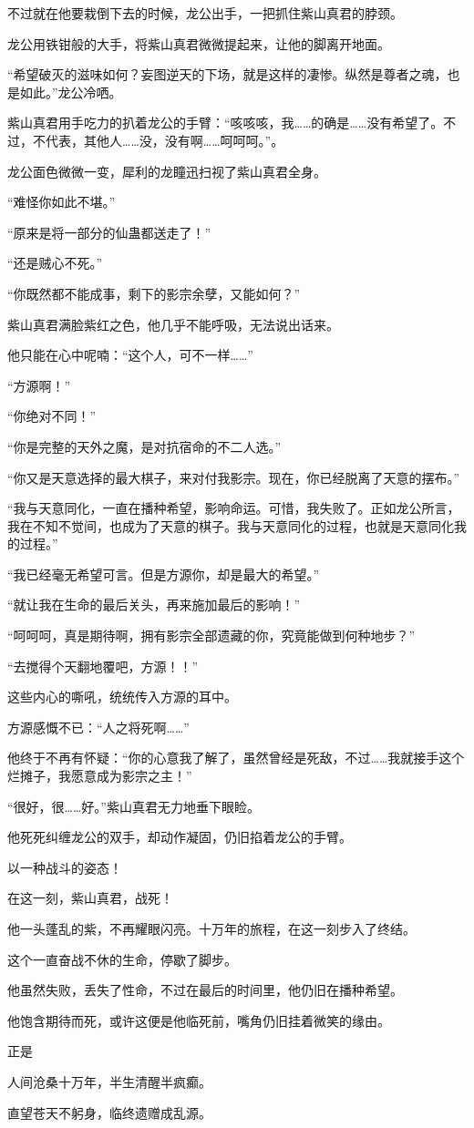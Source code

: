 \begin{this_body}
不过就在他要栽倒下去的时候，龙公出手，一把抓住紫山真君的脖颈。

龙公用铁钳般的大手，将紫山真君微微提起来，让他的脚离开地面。

“希望破灭的滋味如何？妄图逆天的下场，就是这样的凄惨。纵然是尊者之魂，也是如此。”龙公冷哂。

紫山真君用手吃力的扒着龙公的手臂：“咳咳咳，我……的确是……没有希望了。不过，不代表，其他人……没，没有啊……呵呵呵。”。

龙公面色微微一变，犀利的龙瞳迅扫视了紫山真君全身。

“难怪你如此不堪。”

“原来是将一部分的仙蛊都送走了！”

“还是贼心不死。”

“你既然都不能成事，剩下的影宗余孽，又能如何？”

紫山真君满脸紫红之色，他几乎不能呼吸，无法说出话来。

他只能在心中呢喃：“这个人，可不一样……”

“方源啊！”

“你绝对不同！”

“你是完整的天外之魔，是对抗宿命的不二人选。”

“你又是天意选择的最大棋子，来对付我影宗。现在，你已经脱离了天意的摆布。”

“我与天意同化，一直在播种希望，影响命运。可惜，我失败了。正如龙公所言，我在不知不觉间，也成为了天意的棋子。我与天意同化的过程，也就是天意同化我的过程。”

“我已经毫无希望可言。但是方源你，却是最大的希望。”

“就让我在生命的最后关头，再来施加最后的影响！”

“呵呵呵，真是期待啊，拥有影宗全部遗藏的你，究竟能做到何种地步？”

“去搅得个天翻地覆吧，方源！！”

这些内心的嘶吼，统统传入方源的耳中。

方源感慨不已：“人之将死啊……”

他终于不再有怀疑：“你的心意我了解了，虽然曾经是死敌，不过……我就接手这个烂摊子，我愿意成为影宗之主！”

“很好，很……好。”紫山真君无力地垂下眼睑。

他死死纠缠龙公的双手，却动作凝固，仍旧掐着龙公的手臂。

以一种战斗的姿态！

在这一刻，紫山真君，战死！

他一头蓬乱的紫，不再耀眼闪亮。十万年的旅程，在这一刻步入了终结。

这个一直奋战不休的生命，停歇了脚步。

他虽然失败，丢失了性命，不过在最后的时间里，他仍旧在播种希望。

他饱含期待而死，或许这便是他临死前，嘴角仍旧挂着微笑的缘由。

正是

人间沧桑十万年，半生清醒半疯癫。

直望苍天不躬身，临终遗赠成乱源。

\end{this_body}

